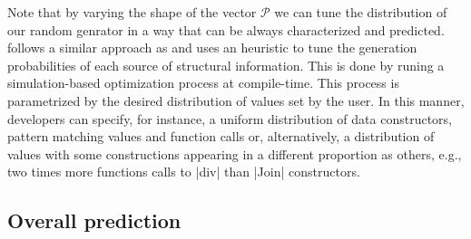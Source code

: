 Note that by varying the shape of the vector $\mathcal{P}$ we can tune the
distribution of our random genrator in a way that can be always characterized
and predicted.
%
\dragenp follows a similar approach as \dragen and uses an heuristic to tune the
generation probabilities of each source of structural information.
%
This is done by runing a simulation-based optimization process at compile-time.
%
This process is parametrized by the desired distribution of values set by the
user.
%
In this manner, developers can specify, for instance, a uniform distribution of
data constructors, pattern matching values and function calls or, alternatively,
a distribution of values with some constructions appearing in a different
proportion as others, e.g., two times more functions calls to |div| than |Join|
constructors.

\subsection{Overall prediction}
%

